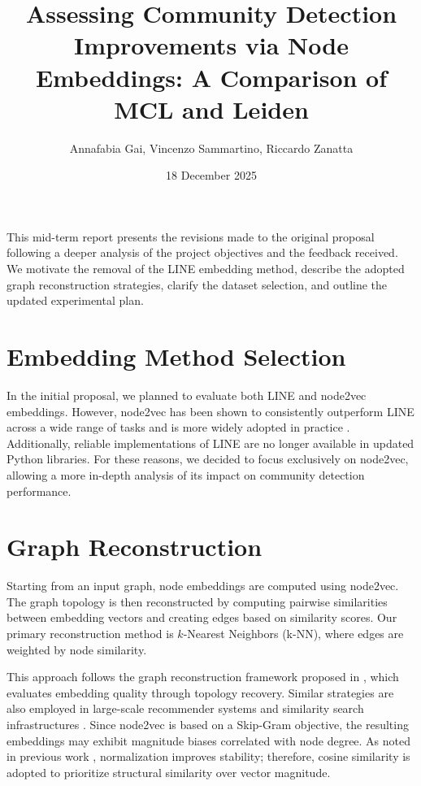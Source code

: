 \documentclass[a4paper,11pt]{article}
\title{Assessing Community Detection Improvements via Node Embeddings: A Comparison of MCL and Leiden}
\author{Annafabia Gai, Vincenzo Sammartino, Riccardo Zanatta}
\date{18 December 2025}
\begin{document}
\maketitle

This mid-term report presents the revisions made to the original proposal following a deeper analysis of the project objectives and the feedback received. We motivate the removal of the LINE embedding method, describe the adopted graph reconstruction strategies, clarify the dataset selection, and outline the updated experimental plan.

\section{Embedding Method Selection}
In the initial proposal, we planned to evaluate both LINE and node2vec embeddings. However, node2vec has been shown to consistently outperform LINE across a wide range of tasks and is more widely adopted in practice \cite{grover2016node2vec}. Additionally, reliable implementations of LINE are no longer available in updated Python libraries. For these reasons, we decided to focus exclusively on node2vec, allowing a more in-depth analysis of its impact on community detection performance.

\section{Graph Reconstruction}
Starting from an input graph, node embeddings are computed using node2vec. The graph topology is then reconstructed by computing pairwise similarities between embedding vectors and creating edges based on similarity scores. Our primary reconstruction method is $k$-Nearest Neighbors (k-NN), where edges are weighted by node similarity.

This approach follows the graph reconstruction framework proposed in \cite{yip2023restore}, which evaluates embedding quality through topology recovery. Similar strategies are also employed in large-scale recommender systems and similarity search infrastructures \cite{ying2018graph,wang2018billion,johnson2019billion}. Since node2vec is based on a Skip-Gram objective, the resulting embeddings may exhibit magnitude biases correlated with node degree. As noted in previous work \cite{ying2018graph,chanpuriyadeepwalking}, normalization improves stability; therefore, cosine similarity is adopted to prioritize structural similarity over vector magnitude.
\end{document}
